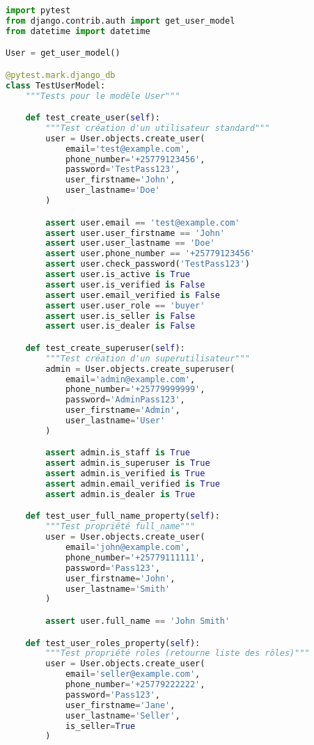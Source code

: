 \begin{lstlisting}[language=Python, caption=users/tests/test\_models.py]
import pytest
from django.contrib.auth import get_user_model
from datetime import datetime

User = get_user_model()

@pytest.mark.django_db
class TestUserModel:
    """Tests pour le modèle User"""

    def test_create_user(self):
        """Test création d'un utilisateur standard"""
        user = User.objects.create_user(
            email='test@example.com',
            phone_number='+25779123456',
            password='TestPass123',
            user_firstname='John',
            user_lastname='Doe'
        )

        assert user.email == 'test@example.com'
        assert user.user_firstname == 'John'
        assert user.user_lastname == 'Doe'
        assert user.phone_number == '+25779123456'
        assert user.check_password('TestPass123')
        assert user.is_active is True
        assert user.is_verified is False
        assert user.email_verified is False
        assert user.user_role == 'buyer'
        assert user.is_seller is False
        assert user.is_dealer is False

    def test_create_superuser(self):
        """Test création d'un superutilisateur"""
        admin = User.objects.create_superuser(
            email='admin@example.com',
            phone_number='+25779999999',
            password='AdminPass123',
            user_firstname='Admin',
            user_lastname='User'
        )

        assert admin.is_staff is True
        assert admin.is_superuser is True
        assert admin.is_verified is True
        assert admin.email_verified is True
        assert admin.is_dealer is True

    def test_user_full_name_property(self):
        """Test propriété full_name"""
        user = User.objects.create_user(
            email='john@example.com',
            phone_number='+25779111111',
            password='Pass123',
            user_firstname='John',
            user_lastname='Smith'
        )

        assert user.full_name == 'John Smith'

    def test_user_roles_property(self):
        """Test propriété roles (retourne liste des rôles)"""
        user = User.objects.create_user(
            email='seller@example.com',
            phone_number='+25779222222',
            password='Pass123',
            user_firstname='Jane',
            user_lastname='Seller',
            is_seller=True
        )


\end{lstlisting}
